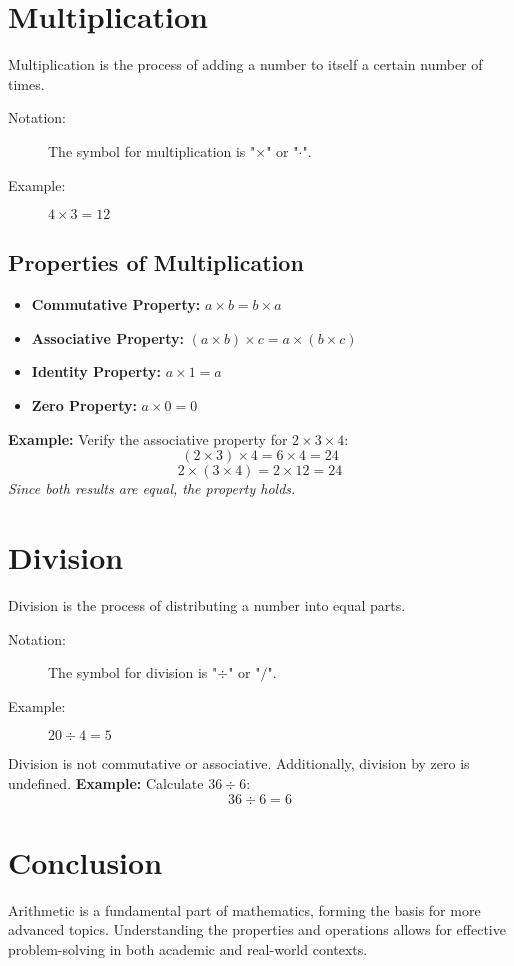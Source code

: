 \documentclass{article}
\begin{document}
\section{Multiplication}
Multiplication is the process of adding a number to itself a certain number of times.
\begin{description}
    \item[Notation:] The symbol for multiplication is "\(\times\)" or "\(\cdot\)".
    \item[Example:] $4 \times 3 = 12$
\end{description}
\subsection*{Properties of Multiplication}
\begin{itemize}
    \item \textbf{Commutative Property:} $a \times b = b \times a$
    \item \textbf{Associative Property:} $(a \times b) \times c = a \times (b \times c)$
    \item \textbf{Identity Property:} $a \times 1 = a$
    \item \textbf{Zero Property:} $a \times 0 = 0$
\end{itemize}
\textbf{Example:} Verify the associative property for $2 \times 3 \times 4$:
\[(2 \times 3) \times 4 = 6 \times 4 = 24\]
\[2 \times (3 \times 4) = 2 \times 12 = 24\]
\textit{Since both results are equal, the property holds.}

\section{Division}
Division is the process of distributing a number into equal parts.
\begin{description}
    \item[Notation:] The symbol for division is "\(\div\)" or "\(/\)".
    \item[Example:] $20 \div 4 = 5$
\end{description}
Division is not commutative or associative. Additionally, division by zero is undefined.
\textbf{Example:} Calculate $36 \div 6$:
\[36 \div 6 = 6\]

\section*{Conclusion}
Arithmetic is a fundamental part of mathematics, forming the basis for more advanced topics. Understanding the properties and operations allows for effective problem-solving in both academic and real-world contexts.
\end{document}

